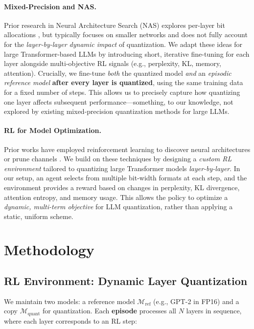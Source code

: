 \documentclass{article}
\begin{document}
	\paragraph{Mixed-Precision and NAS.}
	Prior research in Neural Architecture Search (NAS) explores per-layer bit allocations \cite{dong2019hawq,Wang2020apq}, but typically focuses on smaller networks and does not fully account for the \emph{layer-by-layer dynamic impact} of quantization. We adapt these ideas for large Transformer-based LLMs by introducing short, iterative fine-tuning for each layer alongside multi-objective RL signals (e.g., perplexity, KL, memory, attention). Crucially, we fine-tune \emph{both} the quantized model \emph{and} an \emph{episodic reference model} \textbf{after every layer is quantized}, using the same training data for a fixed number of steps. This allows us to precisely capture how quantizing one layer affects subsequent performance—something, to our knowledge, not explored by existing mixed-precision quantization methods for large LLMs.
	
	\paragraph{RL for Model Optimization.}
	Prior works have employed reinforcement learning to discover neural architectures \cite{zoph2016neural} or prune channels \cite{he2018amc}. We build on these techniques by designing a \emph{custom RL environment} tailored to quantizing large Transformer models \emph{layer-by-layer}. In our setup, an agent selects from multiple bit-width formats at each step, and the environment provides a reward based on changes in perplexity, KL divergence, attention entropy, and memory usage. This allows the policy to optimize a \emph{dynamic, multi-term objective} for LLM quantization, rather than applying a static, uniform scheme.
	
	
	\section{Methodology}
	\label{sec:method}
	\subsection{RL Environment: Dynamic Layer Quantization}
	We maintain two models: a reference model $\mathcal{M}_{\text{ref}}$ (e.g., GPT-2 in FP16) and a copy $\mathcal{M}_{\text{quant}}$ for quantization. Each \textbf{episode} processes all $N$ layers in sequence, where each layer corresponds to an RL step:
	
\end{document}
